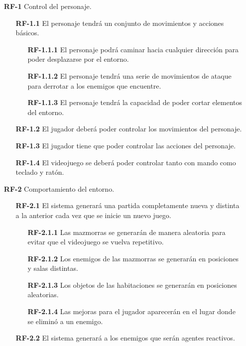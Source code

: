 \begin{enumerate}
    \item[\textbf{RF-1}] Control del personaje.
    \begin{enumerate}
        \item[\textbf{RF-1.1}] El personaje tendrá un conjunto de movimientos y acciones básicos.
        \begin{enumerate}
            \item[\textbf{RF-1.1.1}] El personaje podrá caminar hacia cualquier dirección para poder desplazarse por el entorno.
            \item[\textbf{RF-1.1.2}] El personaje tendrá una serie de  movimientos de ataque para derrotar a los enemigos que encuentre.
            \item[\textbf{RF-1.1.3}] El personaje tendrá la capacidad de poder cortar elementos del entorno.
        \end{enumerate}
        \item[\textbf{RF-1.2}] El jugador deberá poder controlar los movimientos del personaje.
        \item[\textbf{RF-1.3}] El jugador tiene que poder controlar las acciones del personaje.
        \item[\textbf{RF-1.4}] El videojuego se deberá poder controlar tanto con mando como teclado y ratón.
    \end{enumerate}
    \item[\textbf{RF-2}] Comportamiento del entorno.
    \begin{enumerate}
        \item[\textbf{RF-2.1}] El sistema generará una partida completamente nueva y distinta a la anterior cada vez que se inicie un nuevo juego.
        \begin{enumerate}
            \item[\textbf{RF-2.1.1}] Las mazmorras se generarán de manera aleatoria para evitar que el videojuego se vuelva repetitivo.
            \item[\textbf{RF-2.1.2}] Los enemigos de las mazmorras se generarán en posiciones y salas distintas.
            \item[\textbf{RF-2.1.3}] Los objetos de las habitaciones se generarán en posiciones aleatorias.
            \item[\textbf{RF-2.1.4}] Las mejoras para el jugador aparecerán en el lugar donde se eliminó a un enemigo.
        \end{enumerate}
        \item[\textbf{RF-2.2}] El sistema generará a los enemigos que serán agentes reactivos.

\end{enumerate}
\end{enumerate}
